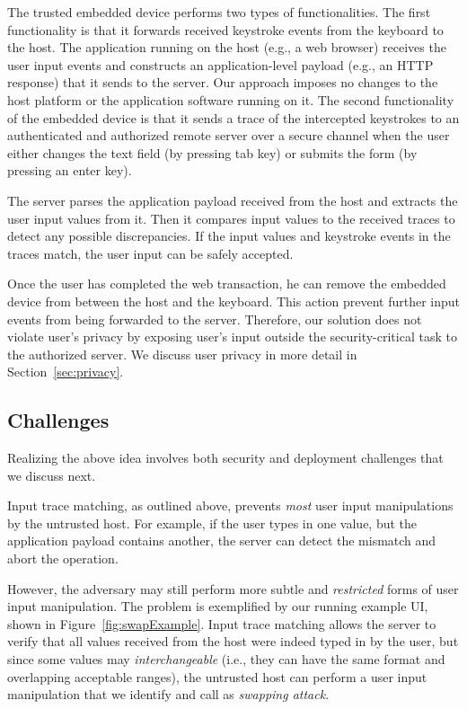 The trusted embedded device performs two types of functionalities. The first functionality is that it forwards received keystroke events from the keyboard to the host. The application running on the host (e.g., a web browser) receives the user input events and constructs an application-level payload (e.g., an HTTP response) that it sends to the server. Our approach imposes no changes to the host platform or the application software running on it. The second functionality of the embedded device is that it sends a trace of the intercepted keystrokes to an authenticated and authorized remote server over a secure channel when the user either changes the text field (by pressing tab key) or submits the form (by pressing an enter key).

The server parses the application payload received from the host and extracts the user input values from it. Then it compares input values to the received traces to detect any possible discrepancies. If the input values and keystroke events in the traces match, the user input can be safely accepted.

Once the user has completed the web transaction, he can remove the embedded device from between the host and the keyboard. This action prevent further input events from being forwarded to the server. Therefore, our solution does not violate user's privacy by exposing user's input outside the security-critical task to the authorized server. We discuss user privacy in more detail in Section~\ref{sec:privacy}.

\subsection{Challenges}
\label{sec:ourApproach:challenges}

Realizing the above idea involves both security and deployment challenges that we discuss next.

 Input trace matching, as outlined above, prevents \emph{most} user input manipulations by the untrusted host. For example, if the user types in one value, but the application payload contains another, the server can detect the mismatch and abort the operation. 

However, the adversary may still perform more subtle and \emph{restricted} forms of user input manipulation.
The problem is exemplified by our running example UI, shown in Figure~\ref{fig:swapExample}. Input trace matching allows the server to verify that all values received from the host were indeed typed in by the user, but since some values may \emph{interchangeable} (i.e., they can have the same format and overlapping acceptable ranges), the untrusted host can perform a user input manipulation that we identify and call as \emph{swapping attack}.

